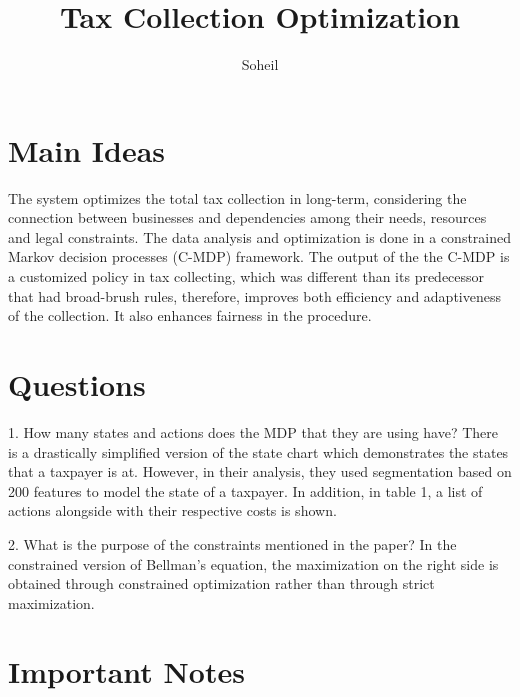 \documentclass{article}
\title{Tax Collection Optimization}
\author{Soheil}
\date{}
\theoremstyle{remark}
\theoremstyle{remark}
\theoremstyle{remark}
\theoremstyle{remark}
\theoremstyle{remark}
\theoremstyle{remark}
\begin{document}
\maketitle
\section{Main Ideas}
 The system optimizes the total tax collection in long-term, considering the connection between businesses and dependencies among their needs, resources and legal constraints. The data analysis and optimization is done in a constrained Markov decision processes (C-MDP) framework. The output of the the C-MDP is a customized policy in tax collecting, which was different than its predecessor that had broad-brush rules, therefore, improves both efficiency and adaptiveness of the collection. It also enhances fairness in the procedure.


\section{Questions}
1. How many states and actions does the MDP that they are using have?
There is a drastically simplified version of the state chart which demonstrates the states that a taxpayer is at. However, in their analysis, they used segmentation based on 200 features to model the state of a taxpayer. In addition, in table 1, a list of actions alongside with their respective costs is shown.

2. What is the purpose of the constraints mentioned in the paper?
In the constrained version of Bellman’s equation, the maximization on the right side is obtained through constrained optimization rather than through strict maximization.

\section{Important Notes}
\end{document}
